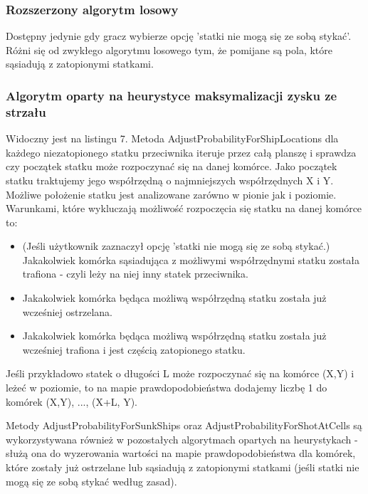 \subsubsection{Rozszerzony algorytm losowy}
Dostępny jedynie gdy gracz wybierze opcję 'statki nie mogą się ze sobą stykać'. Różni się od zwykłego algorytmu losowego tym, że pomijane są pola, które sąsiadują z zatopionymi statkami.

\subsubsection{Algorytm oparty na heurystyce maksymalizacji zysku ze strzału}
Widoczny jest na listingu 7. Metoda AdjustProbabilityForShipLocations dla każdego niezatopionego statku przeciwnika iteruje przez całą planszę i sprawdza czy początek statku może rozpoczynać się na danej komórce. Jako początek statku traktujemy jego współrzędną o najmniejszych współrzędnych X i Y. Możliwe położenie statku jest analizowane zarówno w pionie jak i poziomie. Warunkami, które wykluczają możliwość rozpoczęcia się statku na danej komórce to:
\begin{itemize}
    \item (Jeśli użytkownik zaznaczył opcję 'statki nie mogą się ze sobą stykać.) Jakakolwiek komórka sąsiadująca z możliwymi współrzędnymi statku została trafiona - czyli leży na niej inny statek przeciwnika.
    \item Jakakolwiek komórka będąca możliwą współrzędną statku została już wcześniej ostrzelana.
    \item Jakakolwiek komórka będąca możliwą współrzędną statku została już wcześniej trafiona i jest częścią zatopionego statku.
\end{itemize}
Jeśli przykładowo statek o długości L może rozpoczynać się na komórce (X,Y) i leżeć w poziomie, to na mapie prawdopodobieństwa dodajemy liczbę 1 do komórek (X,Y), ..., (X+L, Y).


Metody AdjustProbabilityForSunkShips oraz AdjustProbabilityForShotAtCells są wykorzystywana również w pozostałych algorytmach opartych na heurystykach - służą ona do wyzerowania wartości na mapie prawdopodobieństwa dla komórek, które zostały już ostrzelane lub sąsiadują z zatopionymi statkami (jeśli statki nie mogą się ze sobą stykać według zasad).

